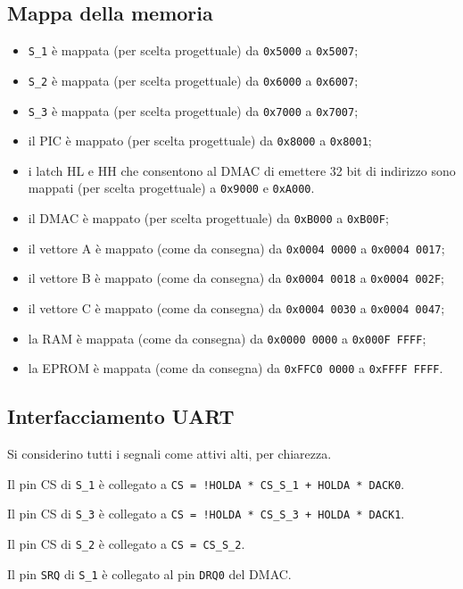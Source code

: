 \documentclass[a4paper]{article}
\begin{document}
\subsection{Mappa della memoria}
\begin{itemize}
\item \texttt{S\_1} è mappata (per scelta progettuale) da \texttt{0x5000} a \texttt{0x5007};
\item \texttt{S\_2} è mappata (per scelta progettuale) da \texttt{0x6000} a \texttt{0x6007};
\item \texttt{S\_3} è mappata (per scelta progettuale) da \texttt{0x7000} a \texttt{0x7007};
\item il PIC è mappato (per scelta progettuale) da \texttt{0x8000} a \texttt{0x8001};
\item i latch HL e HH che consentono al DMAC di emettere 32 bit di indirizzo sono mappati (per scelta progettuale) a \texttt{0x9000} e \texttt{0xA000}.
\item il DMAC è mappato (per scelta progettuale) da \texttt{0xB000} a \texttt{0xB00F};
\item il vettore A è mappato (come da consegna) da \texttt{0x0004 0000} a \texttt{0x0004 0017};
\item il vettore B è mappato (come da consegna) da \texttt{0x0004 0018} a \texttt{0x0004 002F};
\item il vettore C è mappato (come da consegna) da \texttt{0x0004 0030} a \texttt{0x0004 0047};
\item la RAM è mappata (come da consegna) da \texttt{0x0000 0000} a \texttt{0x000F FFFF};
\item la EPROM è mappata (come da consegna) da \texttt{0xFFC0 0000} a \texttt{0xFFFF FFFF}.
\end{itemize}

\subsection{Interfacciamento UART}
Si considerino tutti i segnali come attivi alti, per chiarezza.

Il pin CS di \texttt{S\_1} è collegato a \texttt{CS = !HOLDA * CS\_S\_1 + HOLDA * DACK0}.

Il pin CS di \texttt{S\_3} è collegato a \texttt{CS = !HOLDA * CS\_S\_3 + HOLDA * DACK1}.

Il pin CS di \texttt{S\_2} è collegato a \texttt{CS = CS\_S\_2}.

Il pin \texttt{SRQ} di \texttt{S\_1} è collegato al pin \texttt{DRQ0} del DMAC.
\end{document}
